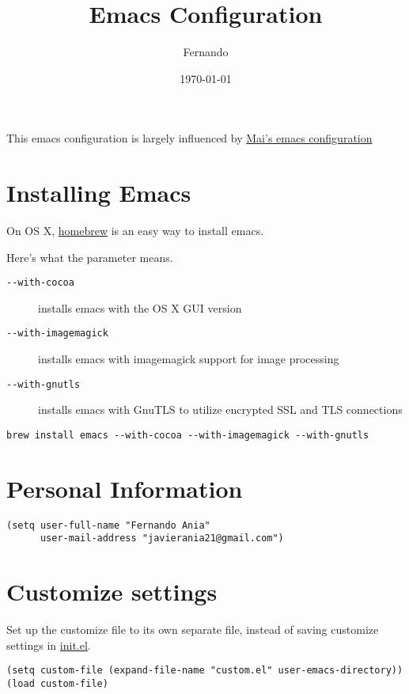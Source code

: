 \documentclass[11pt]{article}
\author{Fernando}
\date{\today}
\title{Emacs Configuration}
\begin{document}
\maketitle
\tableofcontents

This emacs configuration is largely influenced by \href{https://github.com/danielmai/.emacs.d}{Mai's emacs configuration}

\section{Installing Emacs}
\label{sec-1}

On OS X, \href{http://brew.sh/}{homebrew} is an easy way to install emacs.

Here's what the parameter means.
\begin{description}
\item[{\verb~--with-cocoa~}] installs emacs with the OS X GUI version
\item[{\verb~--with-imagemagick~}] installs emacs with imagemagick support for image processing
\item[{\verb~--with-gnutls~}] installs emacs with GnuTLS to utilize encrypted SSL and TLS connections
\end{description}

\begin{verbatim}
brew install emacs --with-cocoa --with-imagemagick --with-gnutls
\end{verbatim}

\section{Personal Information}
\label{sec-2}

\begin{verbatim}
(setq user-full-name "Fernando Ania"
      user-mail-address "javierania21@gmail.com")
\end{verbatim}

\section{Customize settings}
\label{sec-3}

Set up the customize file to its own separate file, instead of saving
customize settings in \href{init.el}{init.el}.

\begin{verbatim}
(setq custom-file (expand-file-name "custom.el" user-emacs-directory))
(load custom-file)
\end{verbatim}
\end{document}

